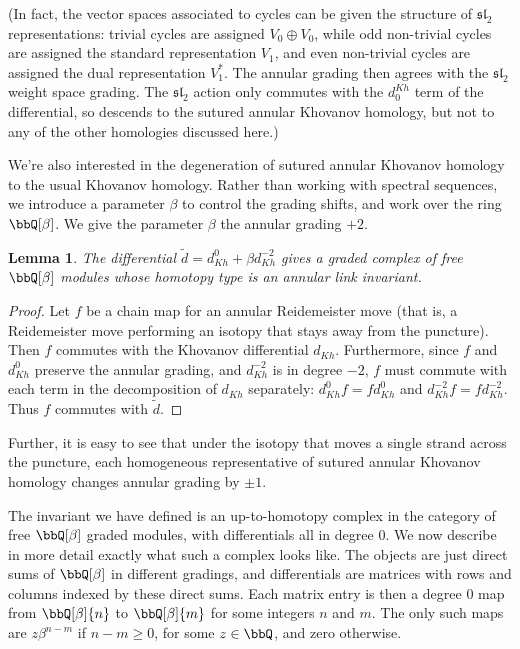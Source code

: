 \documentclass{amsart}
\theoremstyle{plain}
\newtheorem{lem}[prop]{Lemma}
\newcommand{\fsl}{\mathfrak{sl}_2}
\begin{document}
(In fact, the vector spaces associated to cycles can be given the structure of $\fsl$ representations: trivial cycles are assigned $V_0 \oplus V_0$, while odd non-trivial cycles are assigned the standard representation $V_1$, and even non-trivial cycles are assigned the dual representation $V_1^*$. The annular grading then agrees with the $\fsl$ weight space grading. The $\fsl$ action only commutes with the $d^{Kh}_0$ term of the differential, so descends to the sutured annular Khovanov homology, but not to any of the other homologies discussed here.)

We're also interested in the degeneration of sutured annular Khovanov homology to the usual Khovanov homology. Rather than working with spectral sequences, we introduce a parameter $\beta$ to control the grading shifts, and work over the ring $\bbQ[\beta]$. We give the parameter $\beta$ the annular grading $+2$. 

\begin{lem}
The differential $\tilde{d}=d_{Kh}^0 + \beta d_{Kh}^{-2}$ gives a graded complex of free $\bbQ[\beta]$ modules whose homotopy type is an annular link invariant.
\end{lem}

\begin{proof}
Let $f$ be a chain map for an annular Reidemeister move (that is, a Reidemeister move performing an isotopy that stays away from the puncture).  Then $f$ commutes with the Khovanov differential $d_{Kh}$.  Furthermore, since $f$ and $d_{Kh}^0$ preserve the annular grading, and $d_{Kh}^{-2}$ is in degree $-2$, $f$ must commute with each term in the decomposition of $d_{Kh}$ separately: $d_{Kh}^0 f= f d_{Kh}^0$ and $d_{Kh}^{-2} f = f d_{Kh}^{-2}$.  Thus $f$ commutes with $\tilde{d}$.
\end{proof}

Further, it is easy to see that under the isotopy that moves a single strand across the puncture, each homogeneous representative of sutured annular Khovanov homology changes annular grading by $\pm 1$.

The invariant we have defined is an up-to-homotopy complex in the category of free $\bbQ[\beta]$ graded modules, with differentials all in degree 0. We now describe in more detail exactly what such a complex looks like.
The objects are just direct sums of $\bbQ[\beta]$ in different gradings, and differentials are matrices with rows and columns indexed by these direct sums. Each matrix entry is then a degree 0 map from $\bbQ[\beta]\{n\}$ to $\bbQ[\beta]\{m\}$ for some integers $n$ and $m$. The only such maps are $z \beta^{n-m}$ if $n-m \geq 0$, for some $z \in \bbQ$, and zero otherwise.
\end{document}
